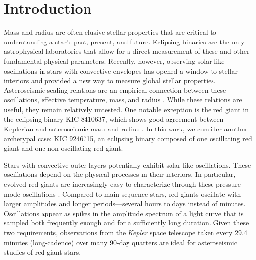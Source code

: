 
\section{Introduction}\label{intro}

Mass and radius are often-elusive stellar properties that are critical to understanding a star's past, present, and future. Eclipsing binaries are the only astrophysical laboratories that allow for a direct measurement of these and other fundamental physical parameters. Recently, however, observing solar-like oscillations in stars with convective envelopes has opened a window to stellar interiors and provided a new way to measure global stellar properties. Asteroseismic scaling relations are an empirical connection between these oscillations, effective temperature, mass, and radius \citep{kje95,hub10,mos13}. While these relations are useful, they remain relatively untested. One notable exception is the red giant in the eclipsing binary KIC 8410637, which shows good agreement between Keplerian and asteroseismic mass and radius \citep{fra13}. In this work, we consider another archetypal case: KIC 9246715, an eclipsing binary composed of one oscillating red giant and one non-oscillating red giant.

Stars with convective outer layers potentially exhibit solar-like oscillations. These oscillations depend on the physical processes in their interiors. In particular, evolved red giants are increasingly easy to characterize through these pressure-mode oscillations \citep[for a review of this topic, see][]{cha13}. Compared to main-sequence stars, red giants oscillate with larger amplitudes and longer periods---several hours to days instead of minutes. Oscillations appear as spikes in the amplitude spectrum of a light curve that is sampled both frequently enough and for a sufficiently long duration. Given these two requirements, observations from the \emph{Kepler} space telescope taken every 29.4 minutes (long-cadence) over many 90-day quarters are ideal for asteroseismic studies of red giant stars.

